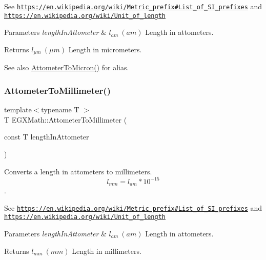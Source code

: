 See \href{https://en.wikipedia.org/wiki/Metric_prefix#List_of_SI_prefixes}{\tt https\+://en.\+wikipedia.\+org/wiki/\+Metric\+\_\+prefix\#\+List\+\_\+of\+\_\+\+S\+I\+\_\+prefixes} and \href{https://en.wikipedia.org/wiki/Unit_of_length}{\tt https\+://en.\+wikipedia.\+org/wiki/\+Unit\+\_\+of\+\_\+length} 
\begin{DoxyParams}{Parameters}
{\em length\+In\+Attometer} & $ l_{am}\ (am)$ Length in attometers. \\
\hline
\end{DoxyParams}
\begin{DoxyReturn}{Returns}
$ l_{\mu m}\ (\mu m)$ Length in micrometers. 
\end{DoxyReturn}
\begin{DoxySeeAlso}{See also}
\mbox{\hyperlink{group___e_g_x_math-_conversions-_length_conversions-_attometer-_non-_s_i_ga9aaf945221fbc8d469121e0fd0980b41}{Attometer\+To\+Micron()}} for alias. 
\end{DoxySeeAlso}
\mbox{\label{group___e_g_x_math-_conversions-_length_conversions-_attometer-_s_i_gaa1844671e09a5d485145eb7cc152ba19}} 
\subsubsection{\texorpdfstring{Attometer\+To\+Millimeter()}{AttometerToMillimeter()}}
{\footnotesize\ttfamily template$<$typename T $>$ \\
T E\+G\+X\+Math\+::\+Attometer\+To\+Millimeter (\begin{DoxyParamCaption}\item[{const T}]{length\+In\+Attometer }\end{DoxyParamCaption})}



Converts a length in attometers to millimeters. \[ l_{mm}=l_{am} * 10^{-15} \]. 

See \href{https://en.wikipedia.org/wiki/Metric_prefix#List_of_SI_prefixes}{\tt https\+://en.\+wikipedia.\+org/wiki/\+Metric\+\_\+prefix\#\+List\+\_\+of\+\_\+\+S\+I\+\_\+prefixes} and \href{https://en.wikipedia.org/wiki/Unit_of_length}{\tt https\+://en.\+wikipedia.\+org/wiki/\+Unit\+\_\+of\+\_\+length} 
\begin{DoxyParams}{Parameters}
{\em length\+In\+Attometer} & $ l_{am}\ (am)$ Length in attometers. \\
\hline
\end{DoxyParams}
\begin{DoxyReturn}{Returns}
$ l_{mm}\ (mm)$ Length in millimeters. 
\end{DoxyReturn}
\mbox{\label{group___e_g_x_math-_conversions-_length_conversions-_attometer-_s_i_gacb010bf3c4fb120c4a43cf16c7d9c77f}} 
